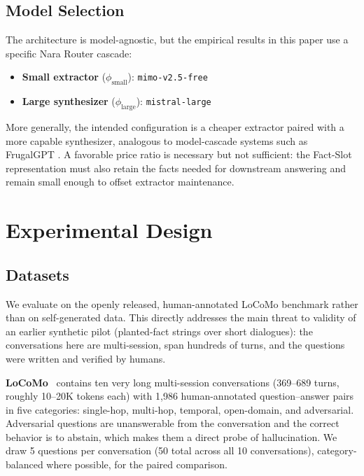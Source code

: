 \documentclass[conference]{IEEEtran}
\begin{document}
\subsection{Model Selection}

The architecture is model-agnostic, but the empirical results in this paper use a specific Nara Router cascade:
\begin{itemize}
    \item \textbf{Small extractor} ($\phi_{\text{small}}$): \texttt{mimo-v2.5-free}
    \item \textbf{Large synthesizer} ($\phi_{\text{large}}$): \texttt{mistral-large}
\end{itemize}

More generally, the intended configuration is a cheaper extractor paired with a more capable synthesizer, analogous to model-cascade systems such as FrugalGPT \cite{chen2023frugalgpt}. A favorable price ratio is necessary but not sufficient: the Fact-Slot representation must also retain the facts needed for downstream answering and remain small enough to offset extractor maintenance.

\section{Experimental Design}
\label{sec:experiments}

\subsection{Datasets}
\label{sec:datasets}

We evaluate on the openly released, human-annotated LoCoMo benchmark rather than on self-generated data. This directly addresses the main
threat to validity of an earlier synthetic pilot (planted-fact strings over
short dialogues): the conversations here are multi-session, span hundreds of
turns, and the questions were written and verified by humans.

\textbf{LoCoMo}~\cite{maharana2024locomo} contains ten very long multi-session
conversations (369--689 turns, roughly 10--20K tokens each) with 1{,}986
human-annotated question--answer pairs in five categories: single-hop,
multi-hop, temporal, open-domain, and adversarial. Adversarial questions are
unanswerable from the conversation and the correct behavior is to abstain, which
makes them a direct probe of hallucination. We draw 5 questions per conversation (50 total across all 10 conversations),
category-balanced where possible, for the paired comparison.
\end{document}
